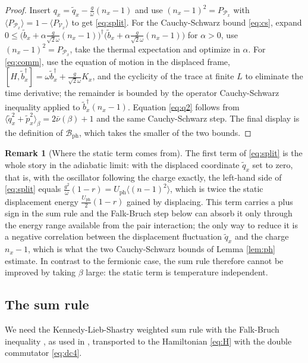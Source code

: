 \documentclass[11pt]{article}
\numberwithin{equation}{section}
\newcommand{\ph}{\mathrm{ph}}
\theoremstyle{definition}
\newtheorem{remark}[theorem]{Remark}
\begin{document}
\begin{proof}
Insert $q_{x}=\tilde q_{x}-\frac{g}{\omega}(n_{x}-1)$ and use $(n_{x}-1)^{2}=P_{\mathcal{P}_{x}}$
with $\langle P_{\mathcal{P}_{x}}\rangle=1-\langle P_{\mathcal{V}_{x}}\rangle$ to get
\eqref{eq:split}. For the Cauchy-Schwarz bound \eqref{eq:cs}, expand
$0\le\big(\tilde b_{x}+\alpha\frac{g}{\sqrt2\omega}(n_{x}-1)\big)^{\dagger}\big(\tilde b_{x}+\alpha\frac{g}{\sqrt2\omega}(n_{x}-1)\big)$
for $\alpha>0$, use $(n_{x}-1)^{2}=P_{\mathcal{P}_{x}}$, take the thermal expectation and
optimize in $\alpha$. For \eqref{eq:comm}, use the equation of motion in the displaced frame,
$[H,\tilde b_{x}^{\dagger}]=\omega\tilde b_{x}^{\dagger}+\frac{g}{\sqrt2\omega}K_{x}$,
and the cyclicity of the trace at finite $L$ to eliminate the time derivative; the
remainder is bounded by the operator Cauchy-Schwarz inequality applied to
$\tilde b_{x}^{\dagger}(n_{x}-1)$. Equation \eqref{eq:q2} follows from
$\langle\tilde q_{x}^{2}+\tilde p_{x}^{2}\rangle_{\beta}=2\bar\nu(\beta)+1$ and the same
Cauchy-Schwarz step. The final display is the definition of $\mathcal{B}_{\ph}$, which
takes the smaller of the two bounds.
\end{proof}

\begin{remark}[Where the static term comes from]\label{rem:static}
The first term of \eqref{eq:split} is the whole story in the adiabatic limit: with the
displaced coordinate $\tilde q_{x}$ set to zero, that is, with the oscillator following
the charge exactly, the left-hand side of \eqref{eq:split} equals
$\frac{g^{2}}{\omega}(1-r)=U_{\mathrm{ph}}\langle(n-1)^{2}\rangle$, which is twice the
static displacement energy $\frac{U_{\mathrm{ph}}}{2}(1-r)$ gained by displacing. This
term carries a plus sign in the sum rule and the Falk-Bruch step below can absorb it only
through the energy range available from the pair interaction; the only way to reduce it
is a negative correlation between the displacement fluctuation $\tilde q_{x}$ and the
charge $n_{x}-1$, which is what the two Cauchy-Schwarz bounds of Lemma \ref{lem:ph}
estimate. In contrast to the fermionic case, the sum rule therefore cannot be improved
by taking $\beta$ large: the static term is temperature independent.
\end{remark}

\subsection{The sum rule}

We need the Kennedy-Lieb-Shastry \cite{kennedy1988} weighted sum rule with the Falk-Bruch
inequality \cite{falk1969}, as used in \cite{rens2026pkodlro}, transported to the
Hamiltonian \eqref{eq:H} with the double commutator \eqref{eq:dc4}.
\end{document}

